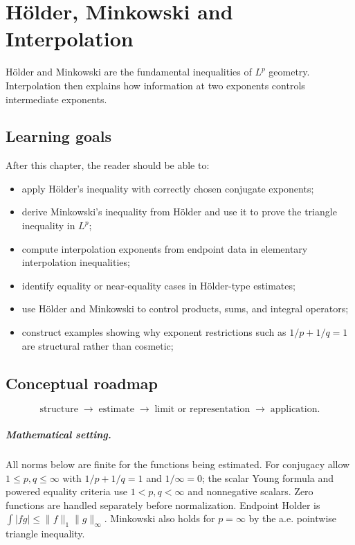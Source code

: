 \chapter{Hölder, Minkowski and Interpolation}
\label{ch:iii07}

Hölder and Minkowski are the fundamental inequalities of $L^p$ geometry. Interpolation then explains how information at two exponents controls intermediate exponents.

\section*{Learning goals}
After this chapter, the reader should be able to:
\begin{itemize}
\item apply Hölder's inequality with correctly chosen conjugate exponents;
\item derive Minkowski's inequality from Hölder and use it to prove the triangle inequality in \(L^p\);
\item compute interpolation exponents from endpoint data in elementary interpolation inequalities;
\item identify equality or near-equality cases in Hölder-type estimates;
\item use Hölder and Minkowski to control products, sums, and integral operators;
\item construct examples showing why exponent restrictions such as \(1/p+1/q=1\) are structural rather than cosmetic;
\end{itemize}
\section*{Conceptual roadmap}
\[
\boxed{\text{structure}\;\longrightarrow\;\text{estimate}\;\longrightarrow\;\text{limit or representation}\;\longrightarrow\;\text{application}.}
\]

\paragraph{Mathematical setting.}
All norms below are finite for the functions being estimated. For conjugacy allow $1\le p,q\le\infty$ with $1/p+1/q=1$ and $1/\infty=0$; the scalar Young formula and powered equality criteria use $1<p,q<\infty$ and nonnegative scalars. Zero functions are handled separately before normalization. Endpoint Holder is $\int|fg|\le\|f\|_1\|g\|_\infty$. Minkowski also holds for $p=\infty$ by the a.e. pointwise triangle inequality.

